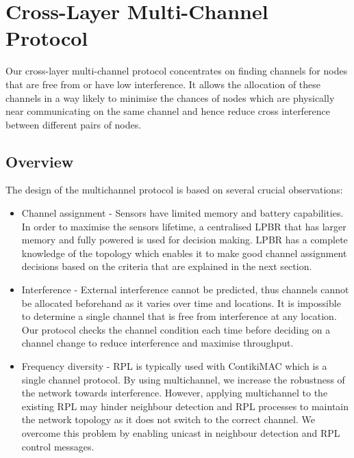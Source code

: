\section{Cross-Layer Multi-Channel Protocol}
\label{sec:multichannel}

Our cross-layer multi-channel protocol concentrates on finding channels for nodes that are
free from or have low interference.  It allows the allocation of these channels in a way likely
to minimise the chances of nodes which are physically near communicating on the same channel and
hence reduce cross interference between different pairs of nodes.

\subsection{Overview}


The design of the multichannel protocol is based on several crucial observations:
\begin{itemize}
\item Channel assignment - Sensors have limited memory and battery capabilities. In order to maximise the sensors lifetime, a centralised LPBR that has larger memory and fully powered is used for decision making. LPBR has a complete knowledge of the topology which enables it to make good channel assignment decisions based on the criteria that are explained in the next section. 
\item Interference - External interference cannot be predicted, thus channels cannot be allocated beforehand as it varies over time and locations. It is impossible to determine a single channel that is free from interference at any location. Our protocol checks the channel condition each time before deciding on a channel change to reduce interference and maximise throughput.
\item Frequency diversity - RPL is typically used with ContikiMAC which is a single channel protocol. By using multichannel, we increase the robustness of the network towards interference. However, applying multichannel to the existing RPL may hinder neighbour detection and RPL processes to maintain the network topology as it does not switch to the correct channel. We overcome this problem by enabling unicast in neighbour detection and RPL control messages. %
\end{itemize}

